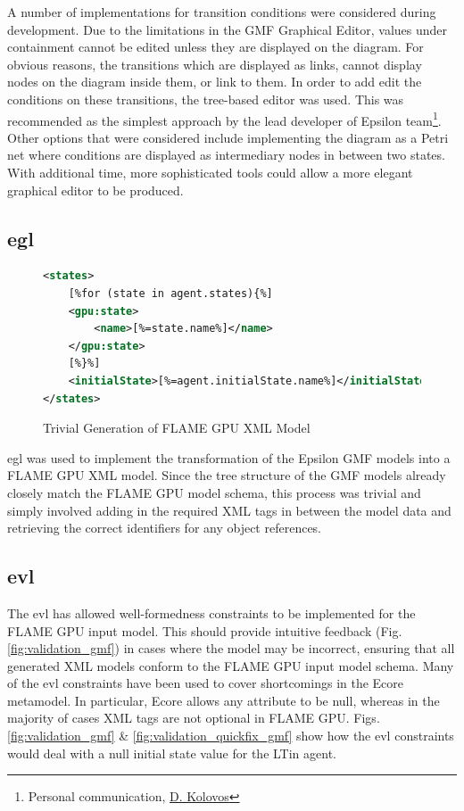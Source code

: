 \documentclass{UoYCSproject}
\begin{document}
A number of implementations for transition conditions were considered during development.
Due to the limitations in the GMF Graphical Editor, values under containment cannot be edited unless they are displayed on the diagram.
For obvious reasons, the transitions which are displayed as links, cannot display nodes on the diagram inside them, or link to them.
In order to add edit the conditions on these transitions, the tree-based editor was used.
This was recommended as the simplest approach by the lead developer of Epsilon team\footnote{Personal communication, \href{https://www-users.cs.york.ac.uk/dkolovos/}{D. Kolovos}}.
Other options that were considered include implementing the diagram as a Petri net where conditions are displayed as intermediary nodes in between two states.
With additional time, more sophisticated tools could allow a more elegant graphical editor to be produced.

\subsection{\acrfull{egl}}
\begin{figure}
\centering
\begin{lstlisting}[language=XML, basicstyle=\tiny]
<states>
    [%for (state in agent.states){%]
    <gpu:state>
        <name>[%=state.name%]</name>
    </gpu:state>
    [%}%]
    <initialState>[%=agent.initialState.name%]</initialState>
</states>
\end{lstlisting}
\caption{Trivial Generation of \gls{FLAME GPU} XML Model}
\label{fig:egl_example}
\end{figure}

\gls{egl} was used to implement the transformation of the Epsilon GMF models into a \gls{FLAME GPU} XML model.
Since the tree structure of the GMF models already closely match the \gls{FLAME GPU} model schema, this process was trivial and simply involved adding in the required XML tags in between the model data and retrieving the correct identifiers for any object references.

\subsection{\acrfull{evl}}
The \gls{evl} has allowed well-formedness constraints to be implemented for the \gls{FLAME GPU} input model.
This should provide intuitive feedback (Fig. \ref{fig:validation_gmf}) in cases where the model may be incorrect, ensuring that all generated XML models conform to the \gls{FLAME GPU} input model schema.
Many of the \gls{evl} constraints have been used to cover shortcomings in the Ecore metamodel.
In particular, Ecore allows any attribute to be null, whereas in the majority of cases XML tags are not optional in \gls{FLAME GPU}.
Figs. \ref{fig:validation_gmf} \& \ref{fig:validation_quickfix_gmf} show how the \gls{evl} constraints would deal with a null initial state value for the \gls{LTin} agent.
\end{document}

